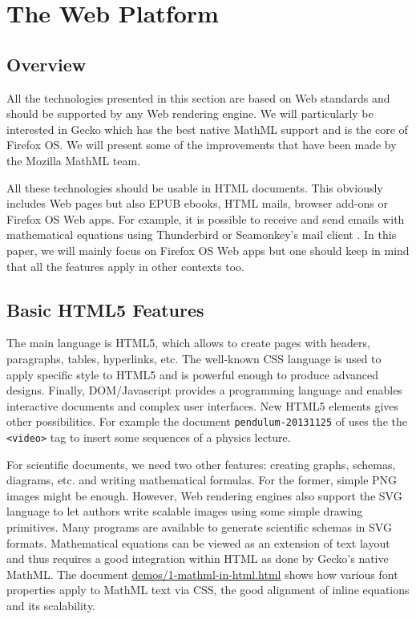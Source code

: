 \section{The Web Platform}

\subsection{Overview}

All the technologies presented in this section are based on Web standards and
should be supported by any Web rendering engine. We will particularly be
interested in Gecko which has the best native MathML support and is the core
of Firefox OS. We will present some of the improvements that have been made
by the Mozilla MathML team.

All these technologies should be usable in HTML documents. This obviously
includes Web pages but also EPUB ebooks, HTML mails, browser add-ons or
Firefox OS Web apps. For example, it is possible to receive and send emails
with mathematical equations using Thunderbird or Seamonkey's mail client
\cite{MathInEmails}.
In this paper, we will mainly
focus on Firefox OS Web apps but one should keep in mind that all the features
apply in other contexts too.

\subsection{Basic HTML5 Features}
\label{sec:basic}

The main language is HTML5, which allows to create pages with headers,
paragraphs, tables, hyperlinks, etc. The well-known CSS language is used to
apply specific style to HTML5 and is powerful enough to produce advanced
designs. Finally, DOM/Javascript provides a programming language and enables
interactive documents and complex user interfaces. New HTML5 elements
gives other possibilities. For example the document
{\tt pendulum-20131125} of \cite{MathInEbooks} uses the
the {\tt <video>} tag to insert some sequences of a physics lecture.

For scientific documents, we need two other features: creating graphs, schemas,
diagrams, etc. and writing mathematical formulas. For the former, simple PNG
images might be enough. However, Web rendering engines also support the SVG
language to let authors write scalable images using some simple drawing
primitives. Many programs are available to generate scientific schemas in SVG
formats. Mathematical equations can be viewed as an extension of text layout
and thus requires a good integration within HTML as done by
Gecko's native MathML. The document \href{http://fred-wang.github.io/MathUI2014/demos/1-mathml-in-html.html}{demos/1-mathml-in-html.html} shows how
various font properties apply to MathML text via CSS, the good alignment
of inline equations and its scalability.

